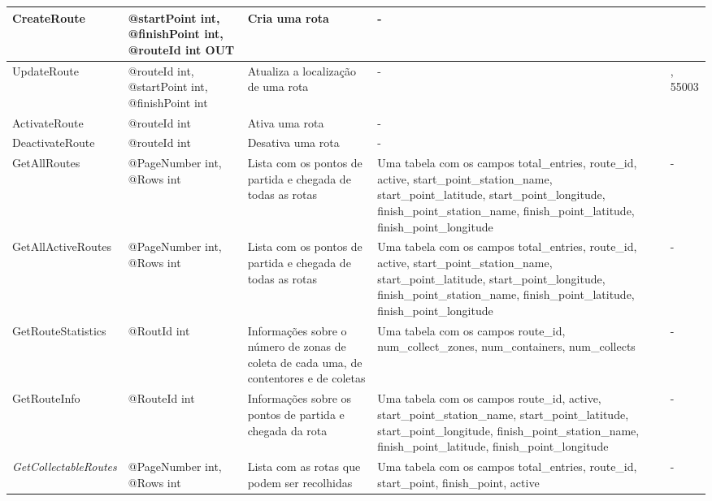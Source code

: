 \documentclass[10pt,a4paper,twoside]{report}
\begin{document}
\begin{longtable}{|>{\RaggedRight\arraybackslash}p{5cm}|>{\RaggedRight\arraybackslash}p{5cm}|>{\RaggedRight\arraybackslash}p{7cm}|>{\RaggedRight\arraybackslash}p{5cm}|>{\RaggedRight\arraybackslash}p{2cm}|}
		CreateRoute & @startPoint int, @finishPoint int, @routeId int OUT & Cria uma rota & - & 55001 \\ \hline
		UpdateRoute & @routeId int, @startPoint int, @finishPoint int & Atualiza a localização de uma rota & - & 55001, 55003 \\ \hline
		ActivateRoute & @routeId int & Ativa uma rota & - & 55003 \\ \hline
		DeactivateRoute & @routeId int & Desativa uma rota & - & 55003 \\ \hline
		GetAllRoutes & @PageNumber int, @Rows int & Lista com os pontos de partida e chegada de todas as rotas & Uma tabela com os campos total\_entries, route\_id, active, start\_point\_station\_name, start\_point\_latitude, start\_point\_longitude, finish\_point\_station\_name, finish\_point\_latitude, finish\_point\_longitude & - \\ \hline
		GetAllActiveRoutes & @PageNumber int, @Rows int & Lista com os pontos de partida e chegada de todas as rotas & Uma tabela com os campos total\_entries, route\_id, active, start\_point\_station\_name, start\_point\_latitude, start\_point\_longitude, finish\_point\_station\_name, finish\_point\_latitude, finish\_point\_longitude & - \\ \hline
		GetRouteStatistics & @RoutId int & Informações sobre o número de zonas de coleta de cada uma, de contentores e de coletas & Uma tabela com os campos route\_id, num\_collect\_zones, num\_containers, num\_collects & - \\ \hline
		GetRouteInfo & @RouteId int & Informações sobre os pontos de partida e chegada da rota & Uma tabela com os campos route\_id, active, start\_point\_station\_name, start\_point\_latitude, start\_point\_longitude, finish\_point\_station\_name, finish\_point\_latitude, finish\_point\_longitude & - \\ \hline
		\textit{GetCollectableRoutes} & @PageNumber int, @Rows int & Lista com as rotas que podem ser recolhidas & Uma tabela com os campos total\_entries, route\_id, start\_point, finish\_point, active & - \\ \hline
	\end{longtable}
	
\end{document}
